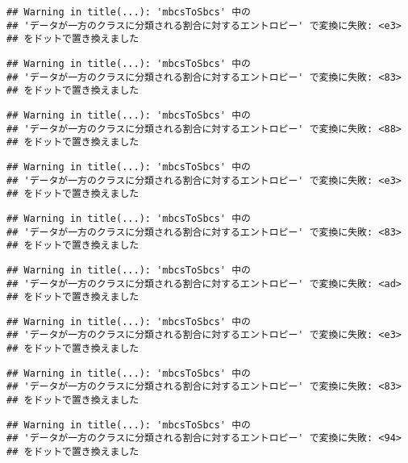 \documentclass[
]{article}
\begin{document}
\begin{verbatim}
## Warning in title(...): 'mbcsToSbcs' 中の
## 'データが一方のクラスに分類される割合に対するエントロピー' で変換に失敗: <e3>
## をドットで置き換えました
\end{verbatim}

\begin{verbatim}
## Warning in title(...): 'mbcsToSbcs' 中の
## 'データが一方のクラスに分類される割合に対するエントロピー' で変換に失敗: <83>
## をドットで置き換えました
\end{verbatim}

\begin{verbatim}
## Warning in title(...): 'mbcsToSbcs' 中の
## 'データが一方のクラスに分類される割合に対するエントロピー' で変換に失敗: <88>
## をドットで置き換えました
\end{verbatim}

\begin{verbatim}
## Warning in title(...): 'mbcsToSbcs' 中の
## 'データが一方のクラスに分類される割合に対するエントロピー' で変換に失敗: <e3>
## をドットで置き換えました
\end{verbatim}

\begin{verbatim}
## Warning in title(...): 'mbcsToSbcs' 中の
## 'データが一方のクラスに分類される割合に対するエントロピー' で変換に失敗: <83>
## をドットで置き換えました
\end{verbatim}

\begin{verbatim}
## Warning in title(...): 'mbcsToSbcs' 中の
## 'データが一方のクラスに分類される割合に対するエントロピー' で変換に失敗: <ad>
## をドットで置き換えました
\end{verbatim}

\begin{verbatim}
## Warning in title(...): 'mbcsToSbcs' 中の
## 'データが一方のクラスに分類される割合に対するエントロピー' で変換に失敗: <e3>
## をドットで置き換えました
\end{verbatim}

\begin{verbatim}
## Warning in title(...): 'mbcsToSbcs' 中の
## 'データが一方のクラスに分類される割合に対するエントロピー' で変換に失敗: <83>
## をドットで置き換えました
\end{verbatim}

\begin{verbatim}
## Warning in title(...): 'mbcsToSbcs' 中の
## 'データが一方のクラスに分類される割合に対するエントロピー' で変換に失敗: <94>
## をドットで置き換えました
\end{verbatim}
\end{document}
